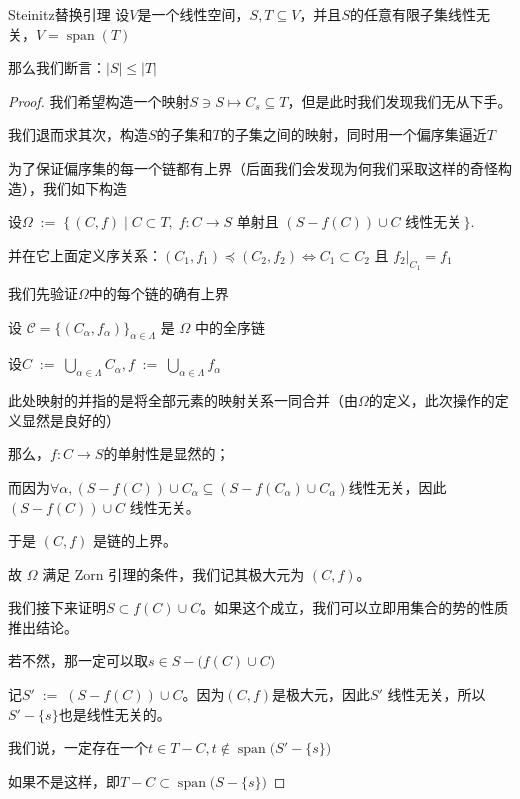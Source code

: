 \documentclass[12pt, a4paper, oneside, UTF8]{ctexbook}
\begin{document}
			\begin{lemma}{Steinitz替换引理}{}
				设$V$是一个线性空间，$S,T \subseteq V$，并且$S$的任意有限子集线性无关，$V=\operatorname{span}(T)$

				那么我们断言：$|S| \leqslant |T|$
			\end{lemma}
			\begin{proof}
				我们希望构造一个映射$S \ni S \mapsto C_s \subseteq T$，但是此时我们发现我们无从下手。

				我们退而求其次，构造$S$的子集和$T$的子集之间的映射，同时用一个偏序集逼近$T$

				为了保证偏序集的每一个链都有上界（后面我们会发现为何我们采取这样的奇怪构造），我们如下构造

				设$\Omega\;:=\;\bigl\{\,(C,f)\mid C\subset T,\;f:C\to S \text{ 单射且 }(S-f(C))\cup C\text{ 线性无关}\,\bigr\}.$
				
				并在它上面定义序关系：$(C_1,f_1)\preceq(C_2,f_2) \iff C_1\subset C_2\text{ 且 }f_2|_{C_1}=f_1$

				我们先验证$\Omega$中的每个链的确有上界

				设 $\mathcal C=\{(C_\alpha,f_\alpha)\}_{\alpha\in\Lambda}$ 是 $\Omega$ 中的全序链

				设$C\;:=\;\bigcup_{\alpha\in\Lambda}C_\alpha,f\;:=\;\bigcup_{\alpha\in\Lambda}f_\alpha$

				此处映射的并指的是将全部元素的映射关系一同合并（由$\Omega$的定义，此次操作的定义显然是良好的）

				那么，$f:C\to S$的单射性是显然的；
				
				而因为$\forall \alpha ,(S-f(C))\cup C_\alpha \subseteq (S-f(C_\alpha )\cup C_\alpha )$线性无关，因此$(S-f(C))\cup C$ 线性无关。
				
				于是 $(C,f)$ 是链的上界。

				故 $\Omega$ 满足 Zorn 引理的条件，我们记其极大元为 $(C,f)$。

				我们接下来证明$S\subset f(C)\cup C$。如果这个成立，我们可以立即用集合的势的性质推出结论。
				
				若不然，那一定可以取$s\in S- \bigl(f(C)\cup C\bigr)$
				
				记$S'\;:=\;(S-f(C))\cup C$。因为$(C,f)$是极大元，因此$S'$ 线性无关，所以$S'-\{s\}$也是线性无关的。
				
				我们说，一定存在一个$t \in T-C,t \notin \operatorname{span}\bigl(S'-\{s\}\bigr)$
				
				如果不是这样，即$T-C\subset \operatorname{span}\bigl(S-\{s\}\bigr)$


\end{proof}
\end{document}
